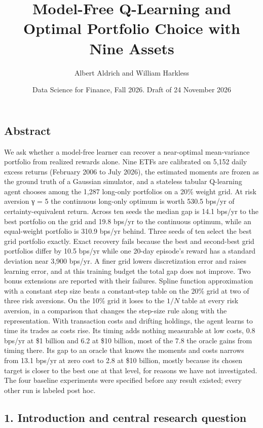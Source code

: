 \documentclass[
  11pt]{article}
\title{Model-Free Q-Learning and Optimal Portfolio Choice with Nine
Assets}
\author{Albert Aldrich and William Harkless}
\date{Data Science for Finance, Fall 2026. Draft of 24 November 2026}
\begin{document}
\maketitle

\subsection{Abstract}\label{abstract}

We ask whether a model-free learner can recover a near-optimal
mean-variance portfolio from realized rewards alone. Nine ETFs are
calibrated on 5,152 daily excess returns (February 2006 to July 2026),
the estimated moments are frozen as the ground truth of a Gaussian
simulator, and a stateless tabular Q-learning agent chooses among the
1,287 long-only portfolios on a 20\% weight grid. At risk aversion γ = 5
the continuous long-only optimum is worth 530.5 bps/yr of
certainty-equivalent return. Across ten seeds the median gap is 14.1
bps/yr to the best portfolio on the grid and 19.8 bps/yr to the
continuous optimum, while an equal-weight portfolio is 310.9 bps/yr
behind. Three seeds of ten select the best grid portfolio exactly. Exact
recovery fails because the best and second-best grid portfolios differ
by 10.5 bps/yr while one 20-day episode's reward has a standard
deviation near 3,900 bps/yr. A finer grid lowers discretization error
and raises learning error, and at this training budget the total gap
does not improve. Two bonus extensions are reported with their failures.
Spline function approximation with a constant step size beats a
constant-step table on the 20\% grid at two of three risk aversions. On
the 10\% grid it loses to the \(1/N\) table at every risk aversion, in a
comparison that changes the step-size rule along with the
representation. With transaction costs and drifting holdings, the agent
learns to time its trades as costs rise. Its timing adds nothing
measurable at low costs, 0.8 bps/yr at \$1 billion and 6.2 at \$10
billion, most of the 7.8 the oracle gains from timing there. Its gap to
an oracle that knows the moments and costs narrows from 13.1 bps/yr at
zero cost to 2.8 at \$10 billion, mostly because its chosen target is
closer to the best one at that level, for reasons we have not
investigated. The four baseline experiments were specified before any
result existed; every other run is labeled post hoc.

\subsection{1. Introduction and central research
question}\label{introduction-and-central-research-question}
\end{document}
